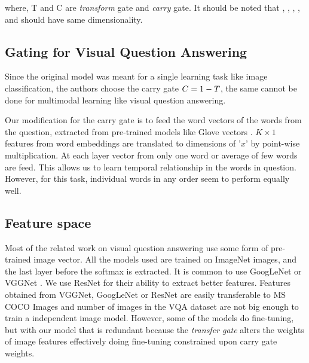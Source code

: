 where, T and C are \textit{transform} gate and \textit{carry} gate.  It should be noted that , , , , and  should have same dimensionality.

\subsection{Gating for Visual Question Answering}
Since the original model was meant for a single learning task like image classification, the authors choose the carry gate $\boldmath{C} = \boldmath{1-T}$, the same cannot be done for multimodal learning like visual question answering. 

Our modification for the carry gate is to feed the word vectors of the words from the question, extracted from pre-trained models like Glove vectors\cite{pennington2014glove} . $K\times1$ features from word embeddings are translated to dimensions of '$x$' by point-wise multiplication. At each layer vector from only one word or average of few words are feed. This allows us to learn temporal relationship in the words in question. However, for this task, individual words in any order seem to perform equally well. 

\subsection{Feature space}

Most of the related work on visual question answering use some form of pre-trained image vector. All the models used are trained on ImageNet images, and the last layer before the softmax is extracted. It is common to use GoogLeNet \cite{jiang2015compositional} \cite{xu2015ask} \cite{zhou2015simple} \cite{wu2016image} or VGGNet \cite{wu2015ask}  \cite{xiong2016dynamic}  \cite{yang2015stacked}   \cite{shih2015look} \cite{ren2015exploring} \cite{andreas2016learning} \cite{Lu2015}\cite{zhu2015visual7w} \cite{noh2015image}. We use ResNet\cite{he2015deep} for their ability to extract better features. Features obtained from VGGNet, GoogLeNet or ResNet are easily transferable to MS COCO Images and  number of images in the VQA dataset are not big enough to train a independent image model. However, some of the models do fine-tuning\cite{noh2015image}, but with our model that is redundant because the \textit{transfer gate} alters the weights of image features effectively doing fine-tuning constrained upon {carry gate} weights.

